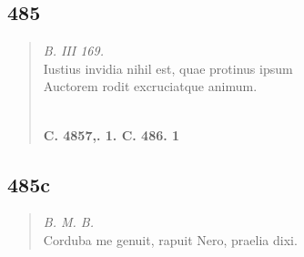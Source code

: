 \documentclass[11pt, a4paper]{report}
\begin{document}
            \subsection*{485}
      \begin{verse}
      \textit{B. III 169.} \\ Iustius invidia nihil est, quae protinus ipsum \\ Auctorem rodit excruciatque animum. \\ 
        ﻿\pagebreak 
    \begin{center} \textbf{C. 4857,. 1. C. 486. 1} \end{center} \marginpar{[29]} 
      \end{verse}
  
            \subsection*{485c}
      \begin{verse}
      \textit{B. M. B.} \\ Corduba me genuit, rapuit Nero, praelia dixi. \\ 
      \end{verse}
  
\end{document}
